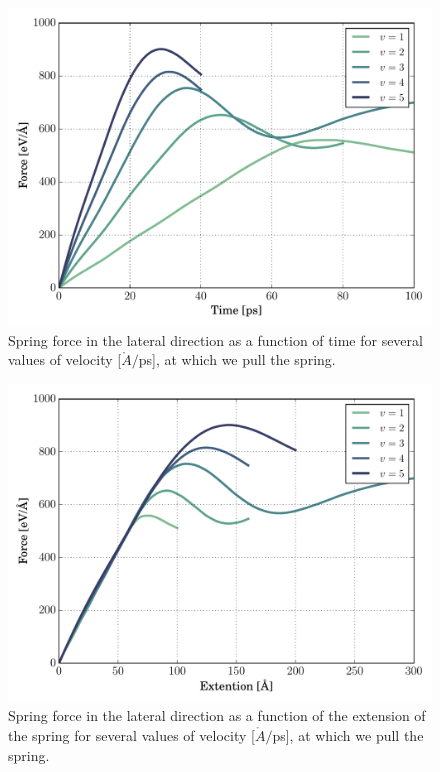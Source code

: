\documentclass[twoside,english]{uiofysmaster}
\begin{document}
\begin{figure}[H]
\centering
\includegraphics[width=0.7\linewidth]{figures/friction/scalingCoeffisient/UnScaledSliding}
\caption{Spring force in the lateral direction as a function of time for several values of velocity [$\mathring{A}/$ps], at which we pull the spring.}
\label{fig:springUnScaled}
\end{figure}
\vfill
\begin{figure}[H]
\centering
\includegraphics[width=0.7\linewidth]{figures/friction/scalingCoeffisient/UnScaledExtention}
\caption{Spring force in the lateral direction as a function of the extension of the spring for several values of velocity [$\mathring{A}/$ps], at which we pull the spring.}
\label{fig:springUnScaledExtension}
\end{figure}
\end{document}
